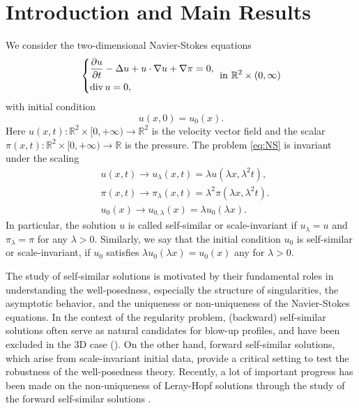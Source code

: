 \documentclass[12pt]{amsart}
\renewcommand{\div}{{\rm div \thinspace }}
\numberwithin{equation}{section}              %
\theoremstyle{remark}
\begin{document}
    \maketitle
    
	\section{Introduction and Main Results}
	

	
	
	We consider the two-dimensional Navier-Stokes equations
	\begin{equation}\label{eq:NS}
		\left\{
		\begin{aligned}
			&\frac{\partial  {u}}{\partial t} -\Delta {u} +  {u}\cdot \nabla  {u} +\nabla \pi =0,\\
			&\div   {u} = 0, \\
		\end{aligned}
		\right.  \textrm{ in } \mathbb{R}^2\times (0,\infty)
	\end{equation}
	with initial condition 
	\begin{equation}\label{eq:initial}
		u(x,0)=u_0(x).
	\end{equation}
	Here $ u(x,t): \mathbb{R}^2\times[0,+\infty)\to \mathbb{R}^2$ is the velocity vector field and the scalar $\pi (x,t):\mathbb{R}^2\times[0,+\infty)\to \mathbb{R}$ is the pressure. 
	The  problem \eqref{eq:NS} is invariant under the scaling
	\begin{equation*}
		\begin{aligned}
			&u (x,t) \to u_{\lambda} (x,t) = \lambda u (\lambda x,\lambda^2 t),\\
			&\pi (x,t) \to \pi _{\lambda}(x,t)= \lambda^2 \pi (\lambda x,\lambda^2 t).\\
			& u_0(x) \to u_{0,\lambda}(x) =\lambda u_0(\lambda x).
		\end{aligned}
	\end{equation*}
	In particular, the solution $u$  is called  self-similar or  scale-invariant  if
	$u_{\lambda}= u$  and $\pi _{\lambda}=\pi $ for any $\lambda > 0$.
	Similarly, we say that the  initial condition $u_0$ is self-similar or scale-invariant,
	if $u_0$ satisfies $\lambda u_0(\lambda x)= u_0(x)$ any for $\lambda > 0$.
	
	The study of self-similar solutions is motivated by their fundamental roles in understanding the well-posedness, especially the structure of singularities, the asymptotic behavior, and the uniqueness or non-uniqueness of the Navier-Stokes equations. In the context of the regularity problem, (backward) self-similar solutions often serve as natural candidates for blow-up profiles, and have been excluded in the 3D case (\cite{Sverak96, Tsai98}). On the other hand,
    forward self-similar solutions, which arise from scale-invariant initial data, 
    provide a critical setting to test the robustness of the well-posedness theory. Recently, a lot of important progress has been made on the non-uniqueness of Leray-Hopf solutions through the study of the forward 
    self-similar solutions
     \cite{Jia15, Albritton22annals, Guillod23, Thomas25}.
    
\end{document}
